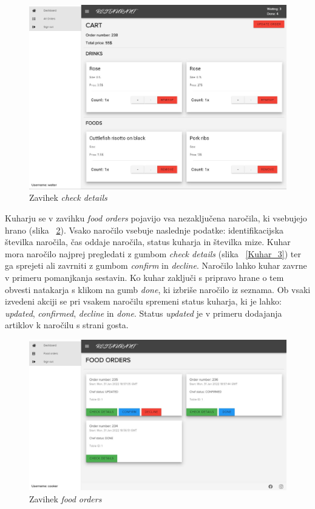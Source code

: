 \documentclass[a4paper, 12pt]{book}
\begin{document}
\begin{figure}[!htb]
\begin{center}
\includegraphics[width=13.7cm]{waiter_2.jpg}
\caption{Zavihek \textit{check details}}
\label{Natakar_3}
\end{center}
\end{figure}

Kuharju se v zavihku \textit{food orders} pojavijo vsa nezaključena naročila, ki vsebujejo hrano (slika ~\ref{Kuhar_4}). Vsako naročilo vsebuje naslednje podatke: identifikacijska številka naročila, čas oddaje naročila, status kuharja in številka mize. Kuhar mora naročilo najprej pregledati z gumbom \textit{check details} (slika  ~\ref{Kuhar_3}) ter ga sprejeti ali zavrniti z gumbom \textit{confirm} in \textit{decline}. Naročilo lahko kuhar zavrne v primeru pomanjkanja sestavin. Ko kuhar zaključi s pripravo hrane o tem obvesti natakarja s klikom na gumb \textit{done}, ki izbriše naročilo iz seznama. Ob vsaki izvedeni akciji se pri vsakem naročilu spremeni status kuharja, ki je lahko: \textit{updated}, \textit{confirmed}, \textit{decline} in \textit{done}. Status \textit{updated} je v primeru dodajanja artiklov k naročilu s strani gosta.

\begin{figure}[!htb]
\centering
\includegraphics[width=13.7cm]{cooker_1.jpg}
\caption{Zavihek \textit{food orders}}
\label{Kuhar_4}
\end{figure}
\end{document}
